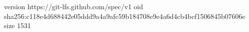 version https://git-lfs.github.com/spec/v1
oid sha256:c118e4d688442e05ddd9a4a9afc59b184708e9e4a6d4cb4bcf1506845b07606e
size 1531
